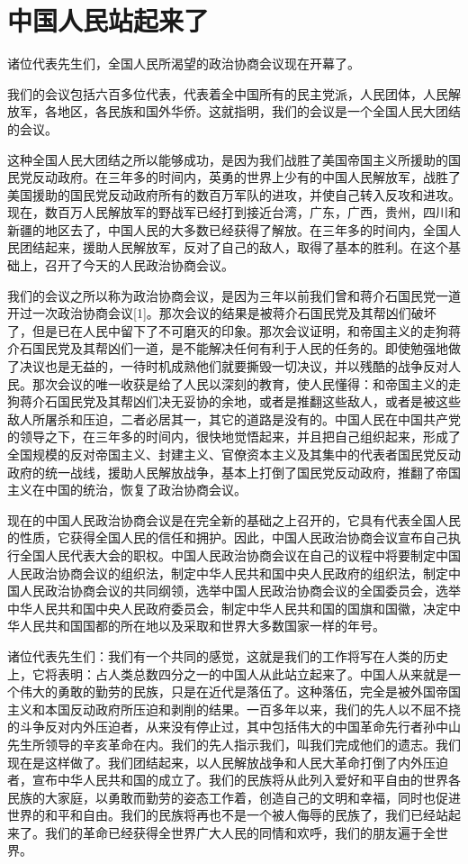 \section[中国人民站起来了]{中国人民站起来了}
诸位代表先生们，全国人民所渴望的政治协商会议现在开幕了。

我们的会议包括六百多位代表，代表着全中国所有的民主党派，人民团体，人民解放军，各地区，各民族和国外华侨。这就指明，我们的会议是一个全国人民大团结的会议。

这种全国人民大团结之所以能够成功，是因为我们战胜了美国帝国主义所援助的国民党反动政府。在三年多的时间内，英勇的世界上少有的中国人民解放军，战胜了美国援助的国民党反动政府所有的数百万军队的进攻，并使自己转入反攻和进攻。现在，数百万人民解放军的野战军已经打到接近台湾，广东，广西，贵州，四川和新疆的地区去了，中国人民的大多数已经获得了解放。在三年多的时间内，全国人民团结起来，援助人民解放军，反对了自己的敌人，取得了基本的胜利。在这个基础上，召开了今天的人民政治协商会议。

我们的会议之所以称为政治协商会议，是因为三年以前我们曾和蒋介石国民党一道开过一次政治协商会议[1]。那次会议的结果是被蒋介石国民党及其帮凶们破坏了，但是已在人民中留下了不可磨灭的印象。那次会议证明，和帝国主义的走狗蒋介石国民党及其帮凶们一道，是不能解决任何有利于人民的任务的。即使勉强地做了决议也是无益的，一待时机成熟他们就要撕毁一切决议，并以残酷的战争反对人民。那次会议的唯一收获是给了人民以深刻的教育，使人民懂得：和帝国主义的走狗蒋介石国民党及其帮凶们决无妥协的余地，或者是推翻这些敌人，或者是被这些敌人所屠杀和压迫，二者必居其一，其它的道路是没有的。中国人民在中国共产党的领导之下，在三年多的时间内，很快地觉悟起来，并且把自己组织起来，形成了全国规模的反对帝国主义、封建主义、官僚资本主义及其集中的代表者国民党反动政府的统一战线，援助人民解放战争，基本上打倒了国民党反动政府，推翻了帝国主义在中国的统治，恢复了政治协商会议。

现在的中国人民政治协商会议是在完全新的基础之上召开的，它具有代表全国人民的性质，它获得全国人民的信任和拥护。因此，中国人民政治协商会议宣布自己执行全国人民代表大会的职权。中国人民政治协商会议在自己的议程中将要制定中国人民政治协商会议的组织法，制定中华人民共和国中央人民政府的组织法，制定中国人民政治协商会议的共同纲领，选举中国人民政治协商会议的全国委员会，选举中华人民共和国中央人民政府委员会，制定中华人民共和国的国旗和国徽，决定中华人民共和国国都的所在地以及采取和世界大多数国家一样的年号。

诸位代表先生们：我们有一个共同的感觉，这就是我们的工作将写在人类的历史上，它将表明：占人类总数四分之一的中国人从此站立起来了。中国人从来就是一个伟大的勇敢的勤劳的民族，只是在近代是落伍了。这种落伍，完全是被外国帝国主义和本国反动政府所压迫和剥削的结果。一百多年以来，我们的先人以不屈不挠的斗争反对内外压迫者，从来没有停止过，其中包括伟大的中国革命先行者孙中山先生所领导的辛亥革命在内。我们的先人指示我们，叫我们完成他们的遗志。我们现在是这样做了。我们团结起来，以人民解放战争和人民大革命打倒了内外压迫者，宣布中华人民共和国的成立了。我们的民族将从此列入爱好和平自由的世界各民族的大家庭，以勇敢而勤劳的姿态工作着，创造自己的文明和幸福，同时也促进世界的和平和自由。我们的民族将再也不是一个被人侮辱的民族了，我们已经站起来了。我们的革命已经获得全世界广大人民的同情和欢呼，我们的朋友遍于全世界。


